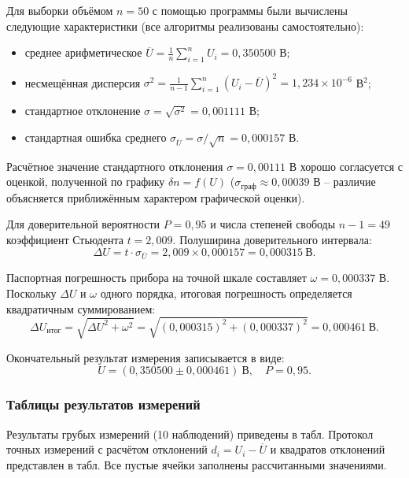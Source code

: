 Для выборки объёмом \(n = 50\) с помощью программы были вычислены следующие характеристики (все алгоритмы реализованы самостоятельно):

\begin{itemize}
    \item среднее арифметическое \(\overline{U} = \frac{1}{n}\sum_{i=1}^{n} U_i = 0,350500\) В;
    \item несмещённая дисперсия \(\sigma^2 = \frac{1}{n-1}\sum_{i=1}^{n} (U_i - \overline{U})^2 = 1,234 \times 10^{-6}\) В\(^2\);
    \item стандартное отклонение \(\sigma = \sqrt{\sigma^2} = 0,001111\) В;
    \item стандартная ошибка среднего \(\sigma_{\overline{U}} = \sigma / \sqrt{n} = 0,000157\) В.
\end{itemize}

Расчётное значение стандартного отклонения \(\sigma = 0,00111\) В хорошо согласуется с оценкой, полученной по графику \(\delta n = f(U)\) (\(\sigma_{\text{граф}} \approx 0,00039\) В – различие объясняется приближённым характером графической оценки).

Для доверительной вероятности \(P = 0,95\) и числа степеней свободы \(n-1 = 49\) коэффициент Стьюдента \(t = 2,009\). Полуширина доверительного интервала:
\[
\Delta U = t \cdot \sigma_{\overline{U}} = 2,009 \times 0,000157 = 0,000315\ \text{В}.
\]

Паспортная погрешность прибора на точной шкале составляет \(\omega = 0,000337\) В. Поскольку \(\Delta U\) и \(\omega\) одного порядка, итоговая погрешность определяется квадратичным суммированием:
\[
\Delta U_{\text{итог}} = \sqrt{\Delta U^2 + \omega^2} = \sqrt{(0,000315)^2 + (0,000337)^2} = 0,000461\ \text{В}.
\]

Окончательный результат измерения записывается в виде:
\[
U = (0,350500 \pm 0,000461)\ \text{В},\quad P = 0,95.
\]

\subsubsection{Таблицы результатов измерений}

Результаты грубых измерений (10 наблюдений) приведены в табл. Протокол точных измерений с расчётом отклонений \(d_i = U_i - \overline{U}\) и квадратов отклонений представлен в табл. Все пустые ячейки заполнены рассчитанными значениями.



